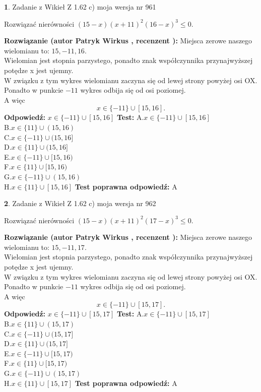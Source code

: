 \documentclass[12pt, a4paper]{article}
\theoremstyle{definition} %
\newtheorem{zad}{}
\newcommand{\zadStart}[1]{\begin{zad}#1\newline}
\newcommand{\zadStop}{\end{zad}}
\newcommand{\rozwStart}[2]{\noindent \textbf{Rozwiązanie (autor #1 , recenzent #2): }\newline}
\newcommand{\rozwStop}{\newline}
\newcommand{\odpStart}{\noindent \textbf{Odpowiedź:}\newline}
\newcommand{\odpStop}{\newline}
\newcommand{\testStart}{\noindent \textbf{Test:}\newline}
\newcommand{\testStop}{\newline}
\newcommand{\kluczStart}{\noindent \textbf{Test poprawna odpowiedź:}\newline}
\newcommand{\kluczStop}{\newline}
\begin{document}
\zadStart{Zadanie z Wikieł Z 1.62 c) moja wersja nr 961}

Rozwiązać nierówności $(15-x)(x+11)^{2}(16-x)^{3}\le0$.
\zadStop
\rozwStart{Patryk Wirkus}{}
Miejsca zerowe naszego wielomianu to: $15, -11, 16$.\\
Wielomian jest stopnia parzystego, ponadto znak współczynnika przy\linebreak najwyższej potędze x jest ujemny.\\ W związku z tym wykres wielomianu zaczyna się od lewej strony powyżej osi OX.\\
Ponadto w punkcie $-11$ wykres odbija się od osi poziomej.\\
A więc $$x \in \{-11\} \cup [15,16].$$
\rozwStop
\odpStart
$x \in \{-11\} \cup [15,16]$
\odpStop
\testStart
A.$x \in \{-11\} \cup [15,16]$\\
B.$x \in \{11\} \cup (15,16)$\\
C.$x \in \{-11\} \cup (15,16]$\\
D.$x \in \{11\} \cup (15,16]$\\
E.$x \in \{-11\} \cup [15,16)$\\
F.$x \in \{11\} \cup [15,16)$\\
G.$x \in \{-11\} \cup (15,16)$\\
H.$x \in \{11\} \cup [15,16]$
\testStop
\kluczStart
A
\kluczStop



\zadStart{Zadanie z Wikieł Z 1.62 c) moja wersja nr 962}

Rozwiązać nierówności $(15-x)(x+11)^{2}(17-x)^{3}\le0$.
\zadStop
\rozwStart{Patryk Wirkus}{}
Miejsca zerowe naszego wielomianu to: $15, -11, 17$.\\
Wielomian jest stopnia parzystego, ponadto znak współczynnika przy\linebreak najwyższej potędze x jest ujemny.\\ W związku z tym wykres wielomianu zaczyna się od lewej strony powyżej osi OX.\\
Ponadto w punkcie $-11$ wykres odbija się od osi poziomej.\\
A więc $$x \in \{-11\} \cup [15,17].$$
\rozwStop
\odpStart
$x \in \{-11\} \cup [15,17]$
\odpStop
\testStart
A.$x \in \{-11\} \cup [15,17]$\\
B.$x \in \{11\} \cup (15,17)$\\
C.$x \in \{-11\} \cup (15,17]$\\
D.$x \in \{11\} \cup (15,17]$\\
E.$x \in \{-11\} \cup [15,17)$\\
F.$x \in \{11\} \cup [15,17)$\\
G.$x \in \{-11\} \cup (15,17)$\\
H.$x \in \{11\} \cup [15,17]$
\testStop
\kluczStart
A
\kluczStop
\end{document}
